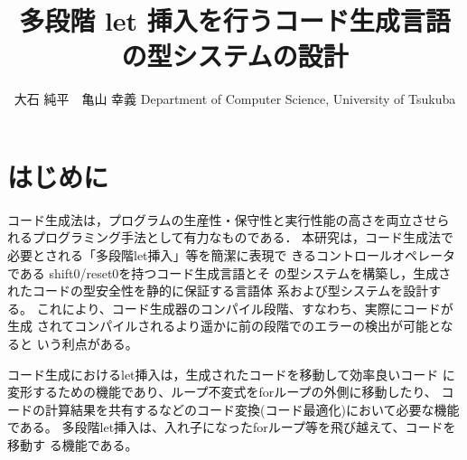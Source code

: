 \documentclass[T]{compsoft}
\theoremstyle{break}
\begin{document}
\title{多段階 let 挿入を行うコード生成言語の型システムの設計}

%
\author{大石 純平　亀山 幸義
%
%
%
%
%
{Department of Computer Science, University of Tsukuba}}


\maketitle \thispagestyle {empty}

\section{はじめに}
コード生成法は，プログラムの生産性・保守性と実行性能の高さを両立させら
れるプログラミング手法として有力なものである．
本研究は，コード生成法で必要とされる「多段階let挿入」等を簡潔に表現で
きるコントロールオペレータである shift0/reset0を持つコード生成言語とそ
の型システムを構築し，生成されたコードの型安全性を静的に保証する言語体
系および型システムを設計する。
これにより、コード生成器のコンパイル段階、すなわち、実際にコードが生成
されてコンパイルされるより遥かに前の段階でのエラーの検出が可能となると
いう利点がある。

コード生成におけるlet挿入は，生成されたコードを移動して効率良いコード
に変形するための機能であり、ループ不変式をforループの外側に移動したり、
コードの計算結果を共有するなどのコード変換(コード最適化)において必要な機能である。
多段階let挿入は、入れ子になったforループ等を飛び越えて、コードを移動す
る機能である。
\end{document}
